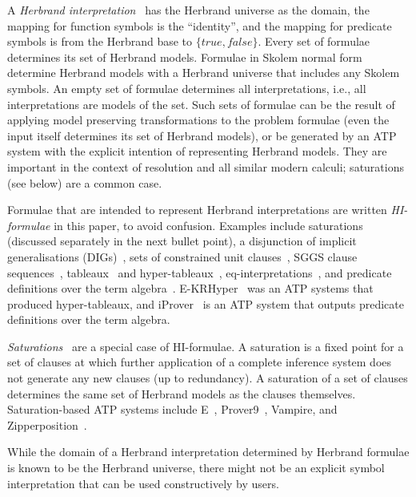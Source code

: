 \documentclass{easychair}
\newenvironment{packed_itemize}{
\vspace*{-0.3em}
\begin{itemize}
\setlength{\partopsep}{0pt}
\setlength{\itemsep}{1pt}
\setlength{\parskip}{0pt}
\setlength{\parsep}{0pt}
}{\end{itemize}}
\begin{document}
A \emph{Herbrand interpretation}~\cite{Her30} has the Herbrand universe as the domain, the mapping 
for function symbols is the ``identity'', and the mapping for predicate symbols is from the 
Herbrand base to $\{true,false\}$.
Every set of formulae determines its set of Herbrand models.
Formulae in Skolem normal form determine Herbrand models with a Herbrand universe that includes any 
Skolem symbols. 
An empty set of formulae determines all interpretations, i.e., all interpretations are models
of the set.
Such sets of formulae can be the result of applying model preserving transformations to the 
problem formulae (even the input itself determines its set of Herbrand models), or be generated 
by an ATP system with the explicit intention of representing Herbrand models.
They are important in the context of resolution and all similar modern calculi; saturations (see 
below) are a common case.
\begin{packed_itemize}
\item Formulae that are intended to represent Herbrand interpretations are written 
      \emph{HI-formulae} in this paper, to avoid confusion.
      Examples include saturations (discussed separately in the next bullet point), a disjunction 
      of implicit generalisations (DIGs)~\cite{LM87}, sets of constrained unit 
      clauses~\cite{CZ92,CP95,CP95-TAB}, SGGS clause sequences~\cite{BP16}, tableaux~\cite{Hah01}
      and hyper-tableaux~\cite{BFN96}, eq-interpretations~\cite{Pel03-EQMC}, and 
      predicate definitions over the term algebra~\cite{SK12}.
      E-KRHyper~\cite{PW07} was an ATP systems that produced hyper-tableaux, and
      iProver~\cite{Kor08,SK12} is an ATP system that outputs predicate definitions 
      over the term algebra.
\item \emph{Saturations}~\cite{BG+01,Pel03-JSC} are a special case of HI-formulae.
      A saturation is a fixed point for a set of clauses at which further application of a
      complete inference system does not generate any new clauses (up to redundancy).
      A saturation of a set of clauses determines the same set of Herbrand models as 
      the clauses themselves.
      Saturation-based ATP systems include E~\cite{SCV19}, Prover9~\cite{McC-Prover9-URL}, 
      Vampire, and Zipperposition~\cite{VB+21}.
\end{packed_itemize}
While the domain of a Herbrand interpretation determined by Herbrand formulae is known to be the 
Herbrand universe, there might not be an explicit symbol interpretation that can be used 
constructively by users.
\end{document}
